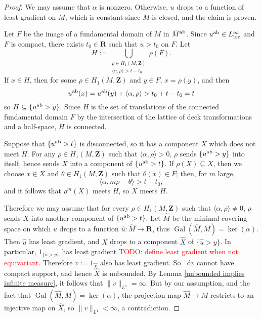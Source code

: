 \documentclass[reqno,11pt]{amsart}
\newcommand{\ZZ}{\mathbf{Z}}
\newcommand{\RR}{\mathbf{R}}
\newcommand*\dif{\mathop{}\!\mathrm{d}}
\DeclareMathOperator{\Gal}{Gal}
\newcommand{\loc}{\mathrm{loc}}
\theoremstyle{definition}
\numberwithin{equation}{section}
\newcommand\todo[1]{\textcolor{red}{TODO: #1}}
\begin{document}
\begin{proof}
We may assume that $\alpha$ is nonzero.
Otherwise, $u$ drops to a function of least gradient on $M$, which is constant since $M$ is closed, and the claim is proven.

Let $F$ be the image of a fundamental domain of $M$ in $\tilde M^{\rm ab}$.
Since $u^{\rm ab} \in L^\infty_\loc$ \cite[Theorem 4.3]{Gorny20} and $F$ is compact, there exists $t_0 \in \RR$ such that $u > t_0$ on $F$.
Let 
$$H := \bigcup_{\substack{\rho \in H_1(M, \ZZ) \\ \langle \alpha, \rho\rangle > t - t_0}} \rho(F).$$
If $x \in H$, then for some $\rho \in H_1(M, \ZZ)$ and $y \in F$, $x = \rho(y)$, and then 
$$u^{\rm ab}(x) = u^{\rm ab}(y) + \langle \alpha, \rho\rangle > t_0 + t - t_0 = t$$
so $H \subseteq \{u^{\rm ab} > y\}$.
Since $H$ is the set of translations of the connected fundamental domain $F$ by the intersection of the lattice of deck transformations and a half-space, $H$ is connected.

Suppose that $\{u^{\rm ab} > t\}$ is disconnected, so it has a component $X$ which does not meet $H$.
For any $\rho \in H_1(M, \ZZ)$ such that $\langle \alpha, \rho\rangle > 0$, $\rho$ sends $\{u^{\rm ab} > y\}$ into itself, hence sends $X$ into a component of $\{u^{\rm ab} > t\}$.
If $\rho(X) \subseteq X$, then we choose $x \in X$ and $\theta \in H_1(M, \ZZ)$ such that $\theta(x) \in F$; then, for $m$ large, 
$$\langle \alpha, m\rho - \theta\rangle > t - t_0,$$
and it follows that $\rho^m(X)$ meets $H$, so $X$ meets $H$.

Therefore we may assume that for every $\rho \in H_1(M, \ZZ)$ such that $\langle \alpha, \rho\rangle \neq 0$, $\rho$ sends $X$ into another component of $\{u^{\rm ab} > t\}$.
Let $\hat M$ be the minimal covering space on which $u$ drops to a function $\hat u: \hat M \to \RR$, thus $\Gal(\hat M, M) = \ker(\alpha)$.
Then $\hat u$ has least gradient, and $X$ drops to a component $\hat X$ of $\{\hat u > y\}$.
In particular, $1_{\{\hat u > y\}}$ has least gradient \cite[Theorem 1]{BOMBIERI1969} \todo{define least gradient when not equivariant}.
Therefore $v := 1_{\hat X}$ also has least gradient.
So $\dif v$ cannot have compact support, and hence $\hat X$ is unbounded.
By Lemma \ref{unbounded implies infinite measure}, it follows that $\|v\|_{L^1} = \infty$.
But by our assumption, and the fact that $\Gal(\hat M, M) = \ker(\alpha)$, the projection map $\hat M \to M$ restricts to an injective map on $\hat X$, so $\|v\|_{L^1} < \infty$, a contradiction.
\end{proof}
\end{document}
